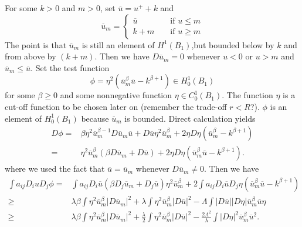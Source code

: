 For some $k>0$ and $m>0$, set $\overline{u}=u^{+}+k$ and 
\begin{equation*}
  \overline{u}_m=\left\{
    \begin{aligned}
      \overline{u}& & \text{ if }u\le m\\
      k+m & & \text{ if }u\ge m
    \end{aligned}\right.
\end{equation*}
The point is that $\overline{u}_m$ is still an element of  $H^{1}\left( B_1 \right) $,but bounded below by $k$ and from above by $\left( k+m \right) $. Then we have $D \overline{u}_m=0$ whenever $u<0$ or $u>m$ and $\overline{u}_m\le \overline{u}$.
Set the test function 
\[
  \phi=\eta^{2}\left( \overline{u}_m^{\beta}\overline{u}-k^{\beta+1} \right) \in H_0^{1}(B_1)
\] 
for some $\beta\ge 0$ and some nonnegative function $\eta \in C_0^{1}(B_1)$. The function $\eta$ is a cut-off function to be chosen later on (remember the trade-off $r<R$?). $\phi$ is an element of $H_0^{1}(B_1)$ because $\overline{u}_m$ is bounded. Direct calculation yields
\begin{align*}
  D \phi = & \beta \eta^2\overline{u}_m^{\beta-1}D \overline{u}_m \overline{u}+D \overline{u}\eta^2\overline{u}_m^{\beta}+2\eta D\eta\left( \overline{u}_m^{\beta}-k^{\beta+1} \right)\\
  =& \eta^2\overline{u}_m^{\beta}\left( \beta D\overline{u}_m+D\overline{u} \right) +2\eta D \eta\left( \overline{u}_m^{\beta}\overline{u}-k^{\beta+1} \right) 
.\end{align*}
where we used the fact that $\overline{u}=\overline{u}_m$ whenever $D \overline{u}_m\neq 0$.
Then we have 
\begin{align*}
  \int a_{ij}D_iuD_j\phi=&\int a_{ij}D_i \overline{u}\left( \beta D_j\overline{u}_m+D_j\overline{u} \right) \eta^{2}\overline{u}_m^{\beta}+2\int a_{ij}D_i\overline{u}D_j\eta\left( \overline{u}_m^{\beta}\overline{u}-k^{\beta+1} \right)\\
  \ge &\lambda\beta \int\eta^{2}\overline{u}^{\beta}_m\left| D\overline{u}_m \right|^{2}+\lambda\int\eta^2\overline{u}_m^{\beta}\left| D\overline{u} \right| ^2-\Lambda\int\left| D\overline{u} \right| \left| D\eta \right| \overline{u}_m^{\beta}\overline{u}\eta\\
  \ge & \lambda\beta \int\eta^2\overline{u}_m^{\beta}\left| D\overline{u}_m \right| ^2+\frac{\lambda}{2}\int\eta^2\overline{u}_m^{\beta}\left| D\overline{u} \right| ^2-\frac{2\Lambda^2}{\lambda}\int \left| D\eta \right| ^2\overline{u}_m^{\beta}\overline{u}^2
.\end{align*}
